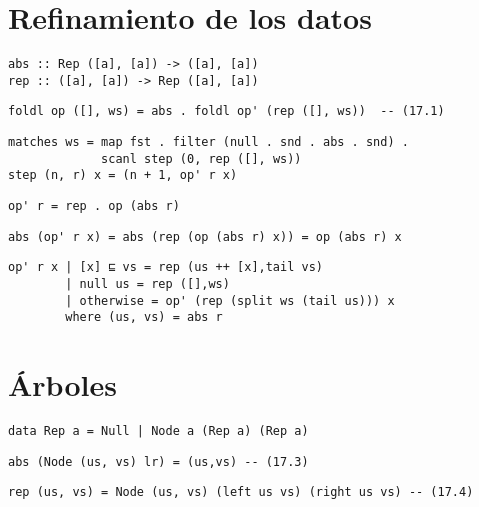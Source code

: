 \inputminted{haskell}{codigo/haskell/1-first-steps.hs}

\section{Refinamiento de los datos}

\begin{verbatim}
abs :: Rep ([a], [a]) -> ([a], [a])
rep :: ([a], [a]) -> Rep ([a], [a])
\end{verbatim}


\begin{verbatim}
foldl op ([], ws) = abs . foldl op' (rep ([], ws))  -- (17.1)
\end{verbatim}

\begin{verbatim}
matches ws = map fst . filter (null . snd . abs . snd) .
             scanl step (0, rep ([], ws))
step (n, r) x = (n + 1, op' r x)    
\end{verbatim}

\begin{verbatim}
op' r = rep . op (abs r)
\end{verbatim}

\begin{verbatim}
abs (op' r x) = abs (rep (op (abs r) x)) = op (abs r) x
\end{verbatim}

\begin{verbatim}
op' r x | [x] ⊑ vs = rep (us ++ [x],tail vs)
        | null us = rep ([],ws)
        | otherwise = op' (rep (split ws (tail us))) x
        where (us, vs) = abs r
\end{verbatim}

\section{Árboles}

\begin{verbatim}
data Rep a = Null | Node a (Rep a) (Rep a)
\end{verbatim}

\begin{verbatim}
abs (Node (us, vs) lr) = (us,vs) -- (17.3)
\end{verbatim}

\begin{verbatim}
rep (us, vs) = Node (us, vs) (left us vs) (right us vs) -- (17.4)
\end{verbatim}

